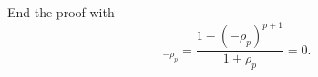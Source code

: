 \documentclass[submission]{FPSAC2023}
\newtheorem{theorem}{Theorem}
\newcommand{\PP}{\mathbb{P}} %
\newcommand{\Peak}{\operatorname{Peak}}
\begin{document}
End the proof with 
\begin{equation*}
[p+1]_{-\rho_p} = \frac{1 - (-\rho_p)^{p+1}}{1+\rho_p} = 0.
\end{equation*}
%
\end{document}
